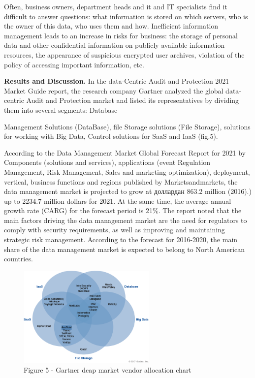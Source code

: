 \begin{multicols}{2}
Often, business owners, department heads and it and IT specialists find
it difficult to answer questions: what information is stored on which
servers, who is the owner of this data, who uses them and how.
Inefficient information management leads to an increase in risks for
business: the storage of personal data and other confidential
information on publicly available information resources, the appearance
of suspicious encrypted user archives, violation of the policy of
accessing important information, etc.

{\bfseries Results and Discussion.} In the data-Centric Audit and
Protection 2021 Market Guide report, the research company Gartner
analyzed the global data-centric Audit and Protection market and listed
its representatives by dividing them into several segments: Database

Management Solutions (DataBase), file Storage solutions (File Storage),
solutions for working with Big Data, Control solutions for SaaS and IaaS
(fig.5).

According to the Data Management Market Global Forecast Report for 2021
by Components (solutions and services), applications (event Regulation
Management, Risk Management, Sales and marketing optimization),
deployment, vertical, business functions and regions published by
Marketsandmarkets, the data management market is projected to grow at
доллардан 863.2 million (2016).) up to 2234.7 million dollars for 2021.
At the same time, the average annual growth rate (CARG) for the forecast
period is 21\%. The report noted that the main factors driving the data
management market are the need for regulators to comply with security
requirements, as well as improving and maintaining strategic risk
management. According to the forecast for 2016-2020, the main share of
the data management market is expected to belong to North American
countries.
\end{multicols}

\begin{figure}[H]
	\centering
	\includegraphics[width=0.6\textwidth]{assets/67}
	\caption*{Figure 5 - Gartner dcap market vendor allocation chart}
\end{figure}


